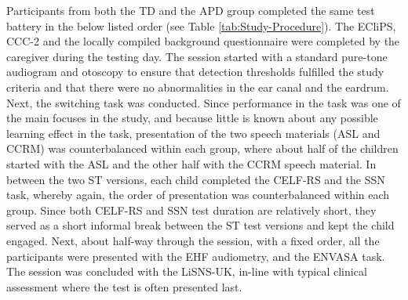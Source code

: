 \documentclass[a4paper, twoside]{templates/ociamthesis}
\begin{document}
Participants from both the TD and the APD group completed the same test battery in the below listed order (see Table \ref{tab:Study-Procedure}). The ECliPS, CCC-2 and the locally compiled background questionnaire were completed by the caregiver during the testing day. The session started with a standard pure-tone audiogram and otoscopy to ensure that detection thresholds fulfilled the study criteria and that there were no abnormalities in the ear canal and the eardrum. Next, the switching task was conducted. Since performance in the task was one of the main focuses in the study, and because little is known about any possible learning effect in the task, presentation of the two speech materials (ASL and CCRM) was counterbalanced within each group, where about half of the children started with the ASL and the other half with the CCRM speech material. In between the two ST versions, each child completed the CELF-RS and the SSN task, whereby again, the order of presentation was counterbalanced within each group. Since both CELF-RS and SSN test duration are relatively short, they served as a short informal break between the ST test versions and kept the child engaged. Next, about half-way through the session, with a fixed order, all the participants were presented with the EHF audiometry, and the ENVASA task. The session was concluded with the LiSNS-UK, in-line with typical clinical assessment where the test is often presented last.\\

\begin{table}

\caption{\label{tab:Study-Procedure}Experimental design and measurements order.}
\centering
{}
\end{table}
\end{document}
